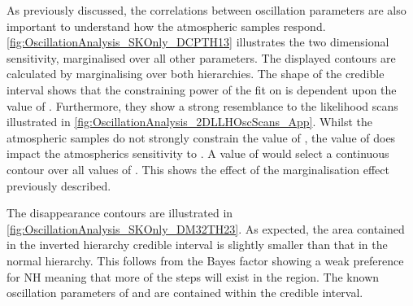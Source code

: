 As previously discussed, the correlations between oscillation parameters are also important to understand how the atmospheric samples respond. \autoref{fig:OscillationAnalysis_SKOnly_DCPTH13} illustrates the two dimensional  sensitivity, marginalised over all other parameters. The displayed contours are calculated by marginalising over both hierarchies. The shape of the \quickmath{1\sigma} credible interval shows that the constraining power of the fit on  is dependent upon the value of . Furthermore, they show a strong resemblance to the likelihood scans illustrated in \autoref{fig:OscillationAnalysis_2DLLHOscScans_App}. Whilst the atmospheric samples do not strongly constrain the value of , the value of  does impact the atmospherics sensitivity to . A value of  would select a continuous contour over all values of . This shows the effect of the marginalisation effect previously described.

The  disappearance contours are illustrated in \autoref{fig:OscillationAnalysis_SKOnly_DM32TH23}. As expected, the area contained in the inverted hierarchy \quickmath{1\sigma} credible interval is slightly smaller than that in the normal hierarchy. This follows from the Bayes factor showing a weak preference for NH meaning that more of the steps will exist in the  region. The known oscillation parameters of  and  are contained within the \quickmath{1\sigma} credible interval.

